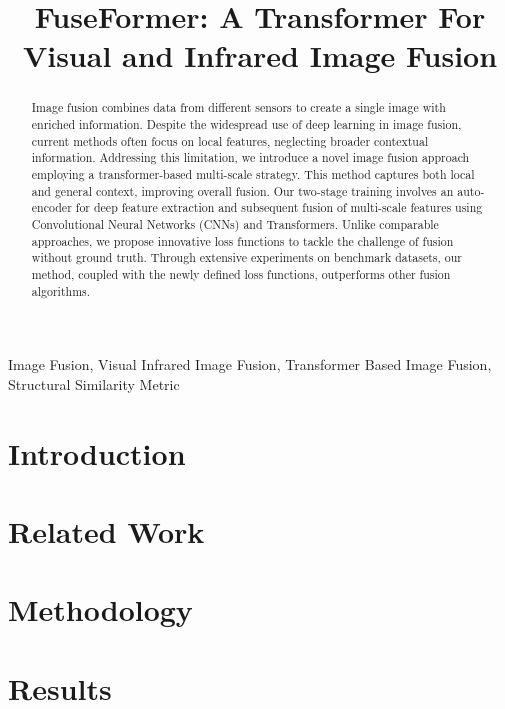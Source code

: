 \documentclass[conference]{IEEEtran}
\begin{document}
\title{FuseFormer: A Transformer For Visual and Infrared Image Fusion\\
}

\author{
\and
{}
}

\maketitle

\begin{abstract}
    Image fusion combines data from different sensors to create a single image with enriched information. Despite the widespread use of deep learning in image fusion, current methods often focus on local features, neglecting broader contextual information. Addressing this limitation, we introduce a novel image fusion approach employing a transformer-based multi-scale strategy. This method captures both local and general context, improving overall fusion. Our two-stage training involves an auto-encoder for deep feature extraction and subsequent fusion of multi-scale features using Convolutional Neural Networks (CNNs) and Transformers. Unlike comparable approaches, we propose innovative loss functions to tackle the challenge of fusion without ground truth. Through extensive experiments on benchmark datasets, our method, coupled with the newly defined loss functions, outperforms other fusion algorithms.
\end{abstract}

\begin{IEEEkeywords}
Image Fusion, Visual Infrared Image Fusion, Transformer Based Image Fusion, Structural Similarity Metric
\end{IEEEkeywords}


\section{Introduction}


\section{Related Work}


\section{Methodology}


\section{Results}


 

\end{document}
